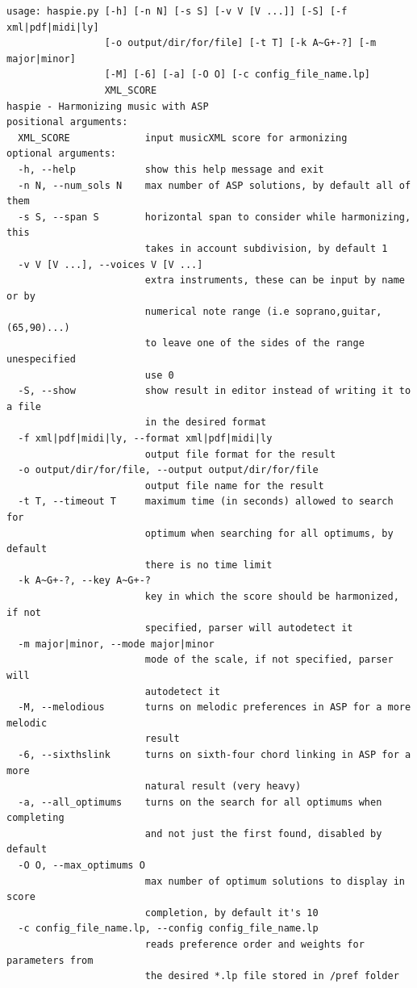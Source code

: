 \begin{Verbatim}[frame=single,fontsize=\relsize{-1}]
usage: haspie.py [-h] [-n N] [-s S] [-v V [V ...]] [-S] [-f xml|pdf|midi|ly]
                 [-o output/dir/for/file] [-t T] [-k A~G+-?] [-m major|minor]
                 [-M] [-6] [-a] [-O O] [-c config_file_name.lp]
                 XML_SCORE
haspie - Harmonizing music with ASP
positional arguments:
  XML_SCORE             input musicXML score for armonizing
optional arguments:
  -h, --help            show this help message and exit
  -n N, --num_sols N    max number of ASP solutions, by default all of them
  -s S, --span S        horizontal span to consider while harmonizing, this
                        takes in account subdivision, by default 1
  -v V [V ...], --voices V [V ...]
                        extra instruments, these can be input by name or by
                        numerical note range (i.e soprano,guitar,(65,90)...)
                        to leave one of the sides of the range unespecified
                        use 0
  -S, --show            show result in editor instead of writing it to a file
                        in the desired format
  -f xml|pdf|midi|ly, --format xml|pdf|midi|ly
                        output file format for the result
  -o output/dir/for/file, --output output/dir/for/file
                        output file name for the result
  -t T, --timeout T     maximum time (in seconds) allowed to search for
                        optimum when searching for all optimums, by default
                        there is no time limit
  -k A~G+-?, --key A~G+-?
                        key in which the score should be harmonized, if not
                        specified, parser will autodetect it
  -m major|minor, --mode major|minor
                        mode of the scale, if not specified, parser will
                        autodetect it
  -M, --melodious       turns on melodic preferences in ASP for a more melodic
                        result
  -6, --sixthslink      turns on sixth-four chord linking in ASP for a more
                        natural result (very heavy)
  -a, --all_optimums    turns on the search for all optimums when completing
                        and not just the first found, disabled by default
  -O O, --max_optimums O
                        max number of optimum solutions to display in score
                        completion, by default it's 10
  -c config_file_name.lp, --config config_file_name.lp
                        reads preference order and weights for parameters from
                        the desired *.lp file stored in /pref folder
\end{Verbatim}

